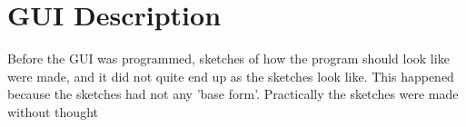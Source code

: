 \section{GUI Description}

Before the GUI was programmed, sketches of how the program should look like were made, and it did not quite end up as the sketches look like. This happened because the sketches had not any 'base form'. Practically the sketches were made without thought 